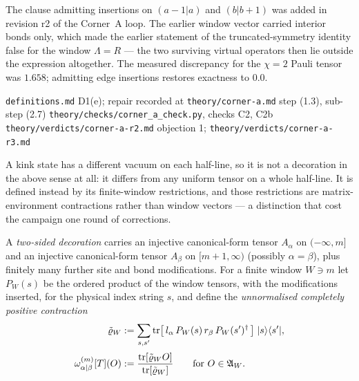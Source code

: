 \begin{remark}
\label{rem:edge-bond-repair}
The clause admitting insertions on $(a-1|a)$ and $(b|b+1)$ was added in
revision r2 of the Corner~A loop. The earlier window vector carried interior
bonds only, which made the earlier statement of the truncated-symmetry
identity false for the window $\Lambda = R$ --- the two surviving virtual
operators then lie outside the expression altogether. The measured
discrepancy for the $\chi = 2$ Pauli tensor was $1.658$; admitting edge
insertions restores exactness to $0.0$.
\end{remark}

%
{\texttt{definitions.md} D1(e); repair recorded at \texttt{theory/corner-a.md}
 step (1.3), sub-step (2.7)}%
{\texttt{theory/checks/corner\_a\_check.py}, checks C2, C2b}%
{\texttt{theory/verdicts/corner-a-r2.md} objection 1;
 \texttt{theory/verdicts/corner-a-r3.md}}

A kink state has a different vacuum on each half-line, so it is not a
decoration in the above sense at all: it differs from any uniform tensor on a
whole half-line. It is defined instead by its finite-window restrictions, and
those restrictions are matrix-environment contractions rather than window
vectors --- a distinction that cost the campaign one round of corrections.

\begin{definition}
\label{def:two-sided-decoration}
A \emph{two-sided decoration} carries an injective canonical-form tensor
$A_{\alpha}$ on $(-\infty, m]$ and an injective canonical-form tensor
$A_{\beta}$ on $[m+1, \infty)$ (possibly $\alpha = \beta$), plus finitely many
further site and bond modifications. For a finite window $W \ni m$ let
$P_{W}(s)$ be the ordered product of the window tensors, with the
modifications inserted, for the physical index string $s$, and define the
\emph{unnormalised completely positive contraction}
\begin{align}
  \tilde{\varrho}_{W}
  &:= \sum_{s,s'} \operatorname{tr}\bigl[\, l_{\alpha} \, P_{W}(s) \,
     r_{\beta} \, P_{W}(s')^{\dagger} \,\bigr] \; |s\rangle\langle s'|,
  \label{eq:two-sided-contraction} \\[2pt]
  \omega_{\alpha|\beta}^{(m)}[T](O)
  &:= \frac{\operatorname{tr}[\tilde{\varrho}_{W} O]}
          {\operatorname{tr}[\tilde{\varrho}_{W}]}
  \qquad \text{for } O \in \mathfrak{A}_{W}.
\end{align}
\end{definition}

